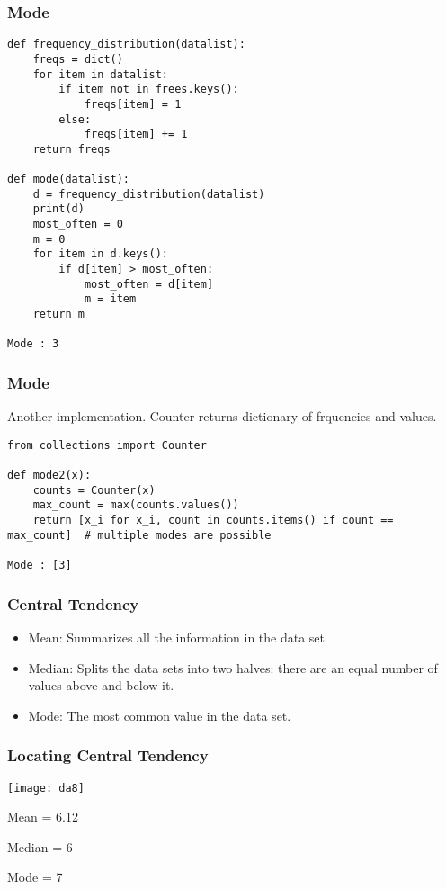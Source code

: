 \begin{frame}[fragile]\frametitle{Mode}
\begin{lstlisting}
def frequency_distribution(datalist):
	freqs = dict()
	for item in datalist:
		if item not in frees.keys():
			freqs[item] = 1
		else:
			freqs[item] += 1
	return freqs

def mode(datalist):
    d = frequency_distribution(datalist)
    print(d)
    most_often = 0
    m = 0
    for item in d.keys():
        if d[item] > most_often:
            most_often = d[item]
            m = item
    return m

Mode : 3
\end{lstlisting}
\end{frame}

\begin{frame}[fragile]\frametitle{Mode}
Another implementation. Counter returns dictionary of frquencies and values.
\begin{lstlisting}
from collections import Counter

def mode2(x):
    counts = Counter(x)
    max_count = max(counts.values())
    return [x_i for x_i, count in counts.items() if count == max_count]  # multiple modes are possible

Mode : [3]
\end{lstlisting}
\end{frame}



\begin{frame}[fragile]\frametitle{Central Tendency}	

\begin{itemize}
\item Mean: Summarizes all the information in the data set
\item Median: Splits the data sets into two halves: there are an equal number of values above and below it.
\item Mode: The most common value in the data set.
\end{itemize}


\end{frame}

\begin{frame}[fragile]\frametitle{Locating Central Tendency}	
\begin{center}
\texttt{[image: da8]}
\end{center}
Mean = 6.12		

Median = 6		

Mode = 7

\end{frame}

